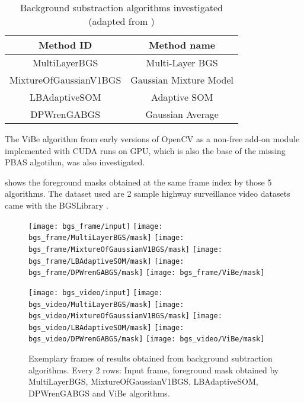 \begin{table}[H]
  \centering
  \begin{tabular}{cc}
  \toprule
  \textbf{Method ID} & \textbf{Method name}\\
  \midrule
  MultiLayerBGS & Multi-Layer BGS \\
  MixtureOfGaussianV1BGS & Gaussian Mixture Model \\
  LBAdaptiveSOM & Adaptive SOM \\
  DPWrenGABGS & Gaussian Average \\
  \bottomrule
  \end{tabular}
  \caption{Background substraction algorithms investigated (adapted from \cite{bgslibrary})}
  \label{Table:bgs}
\end{table}


The ViBe algorithm from early versions of OpenCV as a non-free add-on module implemented with CUDA runs on GPU, which is also the base of the missing PBAS algotihm, was also investigated.

 shows the foreground masks obtained at the same frame index by those 5 algorithms. The dataset used are 2 sample highway surveillance video datasets came with the BGSLibrary \cite{bgslibrary}.

\begin{figure}[htb]
  \centering
  \texttt{[image: bgs\_frame/input]}
  \texttt{[image: bgs\_frame/MultiLayerBGS/mask]}
  \texttt{[image: bgs\_frame/MixtureOfGaussianV1BGS/mask]}
  \texttt{[image: bgs\_frame/LBAdaptiveSOM/mask]}
  \texttt{[image: bgs\_frame/DPWrenGABGS/mask]}
  \texttt{[image: bgs\_frame/ViBe/mask]}


  \texttt{[image: bgs\_video/input]}
  \texttt{[image: bgs\_video/MultiLayerBGS/mask]}
  \texttt{[image: bgs\_video/MixtureOfGaussianV1BGS/mask]}
  \texttt{[image: bgs\_video/LBAdaptiveSOM/mask]}
  \texttt{[image: bgs\_video/DPWrenGABGS/mask]}
  \texttt{[image: bgs\_video/ViBe/mask]}

  \caption{Exemplary frames of results obtained from background subtraction algorithms. Every 2 rows: Input frame, foreground mask obtained by MultiLayerBGS, MixtureOfGaussianV1BGS, LBAdaptiveSOM, DPWrenGABGS and ViBe algorithms.}
  \label{Figure:bgs_frame}
\end{figure}

